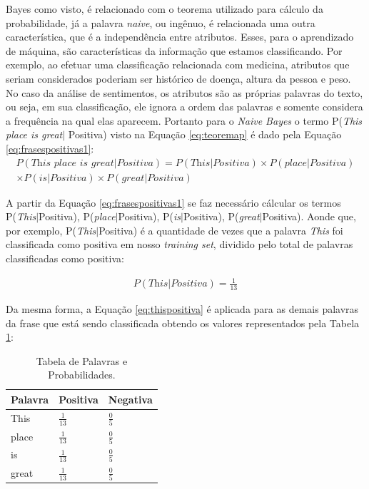 Bayes como visto, é relacionado com o teorema utilizado para cálculo da
probabilidade, já a palavra \textit{naive}, ou ingênuo, é relacionada uma
outra característica, que é a
independência entre atributos. Esses, para o aprendizado de máquina, são
características da informação que estamos classificando. Por exemplo, ao efetuar uma classificação relacionada com medicina, atributos que seriam considerados poderiam ser histórico de doença, altura da pessoa e peso. No caso da análise de sentimentos, os atributos
são as próprias palavras do texto, ou seja, em sua classificação, ele ignora a
ordem das palavras e somente considera a frequência na qual elas aparecem.
Portanto para o \textit{Naive Bayes} o termo P(\textit{This place is
great}$\vert$ Positiva) visto na Equação \ref{eq:teoremap} é dado pela Equação
\ref{eq:frasespositivas1}:
\begin{equation}
\begin{gathered}
P(\textit{This place is great}|Positiva) = P(\textit{This}|Positiva)
\times P(\textit{place}|Positiva) \\ \times P(\textit{is}|Positiva) \times
P(\textit{great}|Positiva)
\label{eq:frasespositivas1}
\end{gathered}
\end{equation}

A partir da Equação \ref{eq:frasespositivas1} se faz necessário cálcular os
termos P(\textit{This}$\vert$Positiva),
P(\textit{place}$\vert$Positiva), P(\textit{is}$\vert$Positiva), P(\textit{great}$\vert$Positiva).
Aonde que, por exemplo, P(\textit{This}$\vert$Positiva) é a quantidade de vezes
que a palavra \textit{This} foi classificada como positiva em nosso
\textit{training set}, dividido pelo total de palavras classificadas como positiva:

\begin{equation}
\begin{gathered}
P(\textit{This}|Positiva) = \frac{1}{13}
\label{eq:thispositiva}
\end{gathered}
\end{equation}


Da mesma forma, a Equação \ref{eq:thispositiva} é aplicada para as demais
palavras da frase que está sendo classificada obtendo os valores representados
pela Tabela \ref{tab:probabilidadesnb}:
\begin{table}[htb]
\centering
\renewcommand{\arraystretch}{1.5}%
\begin{tabular}{lll}
\hline

Palavra & Positiva & Negativa \\ \hline
This & \large $\frac{1}{13}$ & \large $\frac{0}{5}$ \\
place & \large $\frac{1}{13}$ & \large $\frac{0}{5}$ \\
is & \large $\frac{1}{13}$ & \large $\frac{0}{5}$ \\
great & \large $\frac{1}{13}$ & \large $\frac{0}{5}$ \\
\end{tabular}
\caption{Tabela de Palavras e Probabilidades.}
\label{tab:probabilidadesnb}
\end{table}

